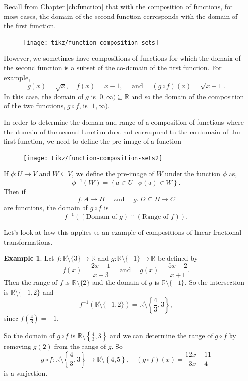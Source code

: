 \documentclass[
]{book}
\theoremstyle{definition}
\theoremstyle{definition}
\newtheorem{example}{Example}[chapter]
\theoremstyle{definition}
\theoremstyle{remark}
\begin{document}
Recall from Chapter \ref{ch:function} that with the composition of functions, for most cases, the domain of the second function corresponds with the domain of the first function.

\begin{figure}

{\centering \texttt{[image: tikz/function-composition-sets]} 

}

\end{figure}

However, we sometimes have compositions of functions for which the domain of the second function is a subset of the co-domain of the first function. For example,
\[g(x) = \sqrt{x}, \quad f(x)=x-1, \quad \mbox{ and } \quad (g\circ f)(x) = \sqrt{x-1}.\]
In this case, the domain of \(g\) is \([0,\infty) \subseteq \mathbb{R}\) and so the domain of the composition of the two functions, \(g\circ f\), is \([1,\infty)\).

In order to determine the domain and range of a composition of functions where the domain of the second function does not correspond to the co-domain of the first function, we need to define the pre-image of a function.

\begin{figure}

{\centering \texttt{[image: tikz/function-composition-sets2]} 

}

\end{figure}

If \(\phi:U\rightarrow V\) and \(W \subseteq V\), we define the pre-image of \(W\) under the function \(\phi\) as,
\[\phi^{-1}(W) = \left\{ a\in U \middle \vert \phi(a)\in W\right\}.\] Then if \[f:A\rightarrow B \quad \mbox{ and } \quad g:D\subseteq B \rightarrow C\] are functions, the domain of \(g\circ f\) is \[f^{-1} \left( (\mbox{Domain of } g) \cap (\mbox{Range of } f)\right).\]

Let's look at how this applies to an example of compositions of linear fractional transformations.

\begin{example}
\protect\hypertarget{exm:unnamed-chunk-260}{}{\label{exm:unnamed-chunk-260} }Let \(f:\mathbb{R}\setminus \{3\} \rightarrow \mathbb{R}\) and \(g:\mathbb{R}\setminus \{-1\} \rightarrow \mathbb{R}\) be defined by \[f(x) = \frac{2x-1}{x-3} \quad \mbox{ and } \quad g(x)=\frac{5x+2}{x+1}.\]
Then the range of \(f\) is \(\mathbb{R} \setminus \{2\}\) and the domain of \(g\) is \(\mathbb{R}\setminus \{-1\}\). So the intersection is \(\mathbb{R}\setminus \{-1,2\}\) and
\[f^{-1} \left(\mathbb{R} \setminus \{-1,2\} \right) = \mathbb{R} \setminus \left\{\frac{4}{3}, 3\right\},\] since \(f\left(\frac{4}{3}\right) = -1\).

So the domain of \(g\circ f\) is \(\mathbb{R} \setminus \left\{\frac{4}{3}, 3\right\}\) and we can determine the range of \(g\circ f\) by removing \(g(2)\) from the range of \(g\). So
\[g\circ f : \mathbb{R} \setminus \left\{\frac{4}{3}, 3\right\} \rightarrow \mathbb{R} \setminus \left\{ 4,5 \right\}, \quad (g\circ f) (x) = \frac{12x-11}{3x-4}\] is a surjection.
\end{example}
\end{document}
